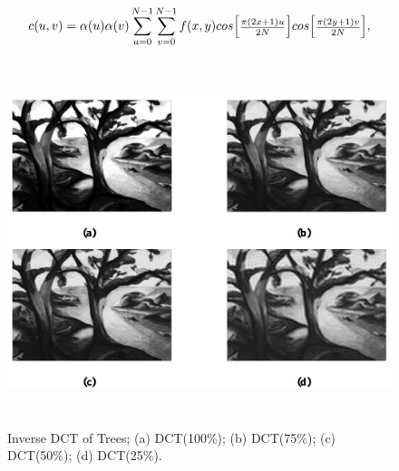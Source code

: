 \begin{equation}
    c(u,v)=\alpha (u)\alpha (v)\sum_{u=0}^{N-1}\sum_{v=0}^{N-1} f(x,y) cos {\begin{bmatrix} {{\pi (2x + 1)u}\over{2N}} \end{bmatrix}} cos {\begin{bmatrix} {{\pi (2y + 1)v}\over{2N}} \end{bmatrix}} ,
    \label{eq:Discrete cosine transform equation}
\end{equation}

\begin{figure}[H]
\centering
    \centerline{\includegraphics[width = 4.6in, height = 4.2in]{../images/inverse-DCT-of-trees.png}}
    \caption{Inverse DCT of Trees; (a) DCT(100\%); (b) DCT(75\%); (c) DCT(50\%); (d) DCT(25\%).}
\end{figure}

\newpage
